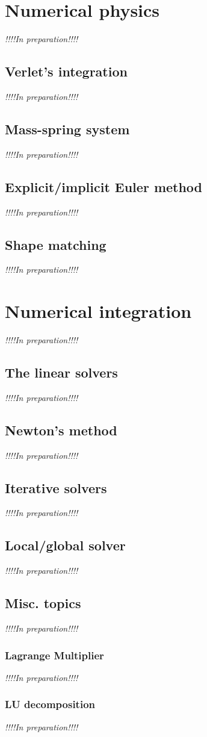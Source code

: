 \documentclass[pdflatex,sn-mathphys-num]{sn-jnl}%
\theoremstyle{thmstyleone}%
\theoremstyle{thmstyletwo}%
\theoremstyle{thmstylethree}%
\newcommand{\inprep}{
	\begin{center}
		\sl\rm {!!!!In preparation!!!!}
\end{center}}
\begin{document}
\section{Numerical physics}\label{NumPhys}
\inprep
\subsection{Verlet's integration}
\inprep
\subsection{Mass-spring system}
\inprep
\subsection{Explicit/implicit Euler method}
\inprep
\subsection{Shape matching}
\inprep

\section{Numerical integration}
\inprep
\subsection{The linear solvers}
\inprep
\subsection{Newton's method}
\inprep
\subsection{Iterative solvers}
\inprep
\subsection{Local/global solver}
\inprep
\subsection{Misc. topics}
\inprep
\subsubsection{Lagrange Multiplier}
\inprep
\subsubsection{LU decomposition}
\inprep
\end{document}
